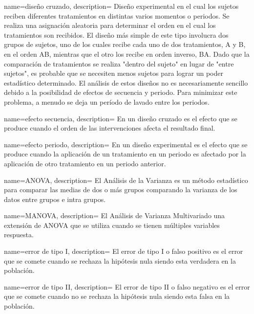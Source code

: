 {
    name=diseño cruzado,
    description={
        Diseño experimental en el cual los sujetos reciben diferentes tratamientos en distintas varios momentos o periodos.
        Se realiza una asignación aleatoria para determinar el orden en el cual los tratamientos son recibidos.
        El diseño más simple de este tipo involucra dos grupos de sujetos,
        uno de los cuales recibe cada uno de dos tratamientos, A y B, en el orden AB,
        mientras que el otro los recibe en orden inverso, BA.
        Dado que la comparación de tratamientos se realiza "dentro del sujeto" en lugar de "entre sujetos", es probable
        que se necesiten menos sujetos para lograr un poder estadístico determinado.
        El análisis de estos diseños no es necesariamente sencillo debido a la posibilidad de efectos de secuencia y periodo.
        Para minimizar este problema, a menudo se deja un período de lavado entre los periodos.
    }
}


{
    name=efecto secuencia,
    description={
        En un \gls{diseño cruzado} es el efecto que se produce cuando el orden de las intervenciones afecta el resultado final.
    }
}


{
    name=efecto periodo,
    description={
        En un diseño experimental es el efecto que se produce cuando la aplicación de un tratamiento en un periodo
        es afectado por la aplicación de otro tratamiento en un periodo anterior.
    }
}

{
    name=ANOVA,
    description={
        El Análisis de la Varianza es un método estadístico para comparar las medias de dos o más grupos
        comparando la varianza de los datos entre grupos e intra grupos.
    }
}


{
    name=MANOVA,
    description={
        El Análisis de Varianza Multivariado una extensión de \gls{ANOVA}
        que se utiliza cuando se tienen múltiples variables respuesta.
    }
}



{
    name=error de tipo I,
    description={
        El error de tipo I o falso positivo es el error que se comete cuando se rechaza la hipótesis nula
        siendo esta verdadera en la población.
    }
}


{
    name=error de tipo II,
    description={
        El error de tipo II o falso negativo es el error que se comete cuando no se rechaza la hipótesis nula
        siendo esta falsa en la población.
    }
}


